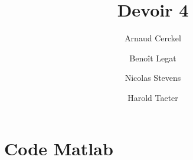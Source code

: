 \documentclass{article}
\title{Devoir 4}
\author{Arnaud Cerckel \and Benoît Legat \and
Nicolas Stevens \and Harold Taeter}
\begin{document}
\maketitle



\section*{Code Matlab}











\end{document}
